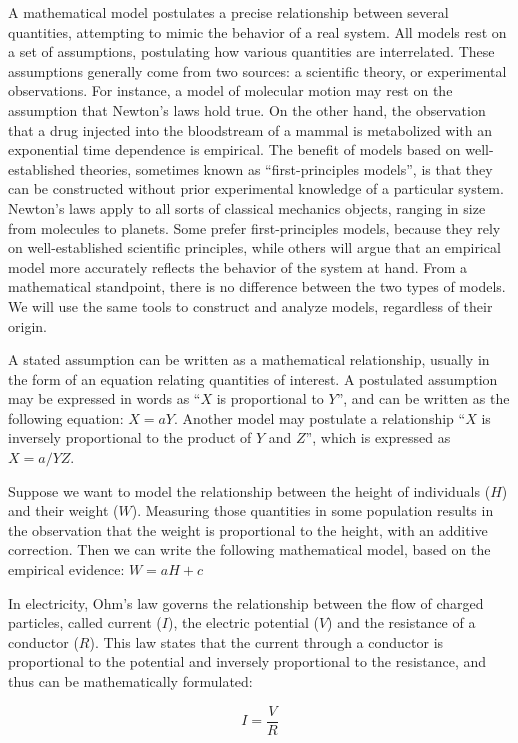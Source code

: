 \documentclass[
  letterpaper,
  DIV=11,
  numbers=noendperiod]{scrreprt}
\begin{document}
A mathematical model postulates a precise relationship between several
quantities, attempting to mimic the behavior of a real system. All
models rest on a set of assumptions, postulating how various quantities
are interrelated. These assumptions generally come from two sources: a
scientific theory, or experimental observations. For instance, a model
of molecular motion may rest on the assumption that Newton's laws hold
true. On the other hand, the observation that a drug injected into the
bloodstream of a mammal is metabolized with an exponential time
dependence is empirical. The benefit of models based on well-established
theories, sometimes known as ``first-principles models'', is that they
can be constructed without prior experimental knowledge of a particular
system. Newton's laws apply to all sorts of classical mechanics objects,
ranging in size from molecules to planets. Some prefer first-principles
models, because they rely on well-established scientific principles,
while others will argue that an empirical model more accurately reflects
the behavior of the system at hand. From a mathematical standpoint,
there is no difference between the two types of models. We will use the
same tools to construct and analyze models, regardless of their origin.

A stated assumption can be written as a mathematical relationship,
usually in the form of an equation relating quantities of interest. A
postulated assumption may be expressed in words as ``\(X\) is
proportional to \(Y\)'', and can be written as the following equation:
\(X = aY\). Another model may postulate a relationship ``\(X\) is
inversely proportional to the product of \(Y\) and \(Z\)'', which is
expressed as \(X = a/YZ\).

Suppose we want to model the relationship between the height of
individuals (\(H\)) and their weight (\(W\)). Measuring those quantities
in some population results in the observation that the weight is
proportional to the height, with an additive correction. Then we can
write the following mathematical model, based on the empirical evidence:
\(W = a H + c\)

In electricity, Ohm's law governs the relationship between the flow of
charged particles, called current (\(I\)), the electric potential
(\(V\)) and the resistance of a conductor (\(R\)). This law states that
the current through a conductor is proportional to the potential and
inversely proportional to the resistance, and thus can be mathematically
formulated:

\[
I = \frac{V}{R}
\]
\end{document}
